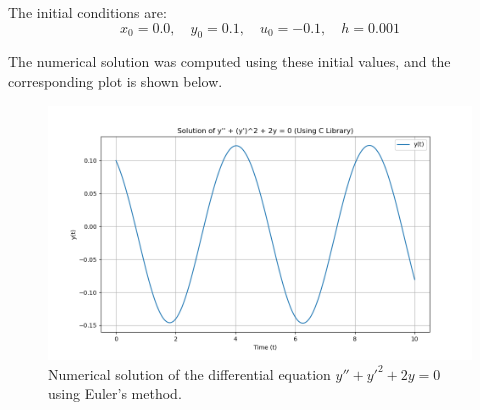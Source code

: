 \documentclass[journal]{IEEEtran}
\begin{document}
The initial conditions are:
\[
x_0 = 0.0, \quad y_0 = 0.1, \quad u_0 = -0.1, \quad h = 0.001
\]

The numerical solution was computed using these initial values, and the corresponding plot is shown below.

\begin{figure}[h!]
    \centering
    \includegraphics[width=\columnwidth]{figs/Fig 9.1.9.png}
    \caption{Numerical solution of the differential equation \( y'' + y'^2 + 2y = 0 \) using Euler's method.}
    \label{fig:solution_plot}
\end{figure}
\end{document}
